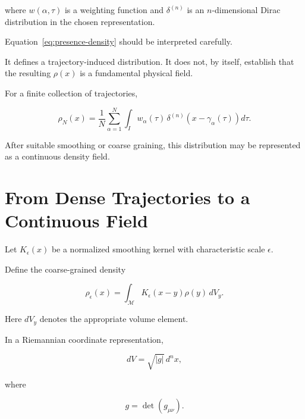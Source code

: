 \documentclass[12pt,oneside]{book}
\begin{document}
where \(w(\alpha,\tau)\) is a weighting function and
\(\delta^{(n)}\) is an \(n\)-dimensional Dirac distribution in
the chosen representation.

Equation~\eqref{eq:presence-density} should be interpreted
carefully.

It defines a trajectory-induced distribution. It does not, by
itself, establish that the resulting \(\rho(x)\) is a
fundamental physical field.

For a finite collection of trajectories,

\begin{equation}
    \rho_N(x)
    =
    \frac{1}{N}
    \sum_{\alpha=1}^{N}
    \int_I
        w_\alpha(\tau)
        \,
        \delta^{(n)}
        \left(
            x-\gamma_\alpha(\tau)
        \right)
    d\tau.
    \label{eq:finite-presence-density}
\end{equation}

After suitable smoothing or coarse graining, this distribution
may be represented as a continuous density field.


\section{From Dense Trajectories to a Continuous Field}
\label{sec:dense-trajectories-field}

Let \(K_\epsilon(x)\) be a normalized smoothing kernel with
characteristic scale \(\epsilon\).

Define the coarse-grained density

\begin{equation}
    \rho_\epsilon(x)
    =
    \int_{\mathcal{M}}
        K_\epsilon(x-y)
        \rho(y)
    \,dV_y.
    \label{eq:coarse-grained-density}
\end{equation}

Here \(dV_y\) denotes the appropriate volume element.

In a Riemannian coordinate representation,

\begin{equation}
    dV
    =
    \sqrt{|g|}
    \,d^n x,
    \label{eq:metric-volume-element}
\end{equation}

where

\begin{equation}
    g
    =
    \det(g_{\mu\nu}).
\end{equation}
\end{document}
